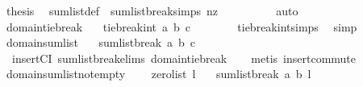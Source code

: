 \begin{isabellebody}
\ {\isacharquery}{\kern0pt}thesis\ \isamarkupfalse%
\ sum{\isacharunderscore}{\kern0pt}list{\isacharunderscore}{\kern0pt}def\ {}\ sumlist{\isacharunderscore}{\kern0pt}break{\isachardot}{\kern0pt}simps\ nz\isanewline
\ \ \ \ \ \ \ \ \isamarkupfalse%
\ auto\ \isanewline
\ \ \ \ \isamarkupfalse%
\isanewline
{}\isamarkupfalse%
%
\endisatagproof
{\isafoldproof}%
%
\isadelimproof
\isanewline
%
\endisadelimproof
\isanewline
{}\isamarkupfalse%
\ domain{\isacharunderscore}{\kern0pt}tie{\isacharunderscore}{\kern0pt}break{\isacharcolon}{\kern0pt}\isanewline
\ \ \ {\isachardoublequoteopen}tie{\isacharunderscore}{\kern0pt}break{\isacharunderscore}{\kern0pt}int\ a\ b\ c\ {\isasymin}\ {\isacharbraceleft}{\kern0pt}{\isacharminus}{\kern0pt}{}\ {\isacharcomma}{\kern0pt}{}{\isacharbraceright}{\kern0pt}{\isachardoublequoteclose}\isanewline
%
\isadelimproof
\ \ %
\endisadelimproof
%
\isatagproof
{}\isamarkupfalse%
\ \ tie{\isacharunderscore}{\kern0pt}break{\isacharunderscore}{\kern0pt}int{\isachardot}{\kern0pt}simps\ \isamarkupfalse%
\ simp%
\endisatagproof
{\isafoldproof}%
%
\isadelimproof
\isanewline
%
\endisadelimproof
\isanewline
{}\isamarkupfalse%
\ domain{\isacharunderscore}{\kern0pt}sumlist{\isacharcolon}{\kern0pt}\isanewline
\ \ \ {\isachardoublequoteopen}sumlist{\isacharunderscore}{\kern0pt}break\ a\ b\ c\ \ {\isasymin}\ {\isacharbraceleft}{\kern0pt}{\isacharminus}{\kern0pt}{}\ {\isacharcomma}{\kern0pt}{}\ {\isacharcomma}{\kern0pt}{}{\isacharbraceright}{\kern0pt}{\isachardoublequoteclose}\isanewline
%
\isadelimproof
\ \ %
\endisadelimproof
%
\isatagproof
{}\isamarkupfalse%
\ \ insertCI\ sumlist{\isacharunderscore}{\kern0pt}break{\isachardot}{\kern0pt}elims\ domain{\isacharunderscore}{\kern0pt}tie{\isacharunderscore}{\kern0pt}break\isanewline
\ \ \isamarkupfalse%
\ {\isacharparenleft}{\kern0pt}metis\ insert{\isacharunderscore}{\kern0pt}commute{\isacharparenright}{\kern0pt}%
\endisatagproof
{\isafoldproof}%
%
\isadelimproof
\isanewline
%
\endisadelimproof
\ \ \isanewline
\isanewline
{}\isamarkupfalse%
\ domain{\isacharunderscore}{\kern0pt}sumlist{\isacharunderscore}{\kern0pt}not{\isacharunderscore}{\kern0pt}empty{\isacharcolon}{\kern0pt}\isanewline
\ \ \ {\isachardoublequoteopen}{\isasymnot}\ zero{\isacharunderscore}{\kern0pt}list\ l{\isachardoublequoteclose}\isanewline
\ \ \ {\isachardoublequoteopen}sumlist{\isacharunderscore}{\kern0pt}break\ a\ b\ l\ \ {\isasymin}\ {\isacharbraceleft}{\kern0pt}{\isacharminus}{\kern0pt}{}{\isacharcomma}{\kern0pt}\ {}{\isacharbraceright}{\kern0pt}{\isachardoublequoteclose}\isanewline

\end{isabellebody}
